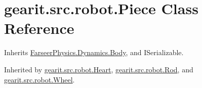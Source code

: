 \hypertarget{classgearit_1_1src_1_1robot_1_1_piece}{\section{gearit.\+src.\+robot.\+Piece Class Reference}
\label{classgearit_1_1src_1_1robot_1_1_piece}
}


Inherits \hyperlink{class_farseer_physics_1_1_dynamics_1_1_body}{Farseer\+Physics.\+Dynamics.\+Body}, and I\+Serializable.



Inherited by \hyperlink{classgearit_1_1src_1_1robot_1_1_heart}{gearit.\+src.\+robot.\+Heart}, \hyperlink{classgearit_1_1src_1_1robot_1_1_rod}{gearit.\+src.\+robot.\+Rod}, and \hyperlink{classgearit_1_1src_1_1robot_1_1_wheel}{gearit.\+src.\+robot.\+Wheel}.

